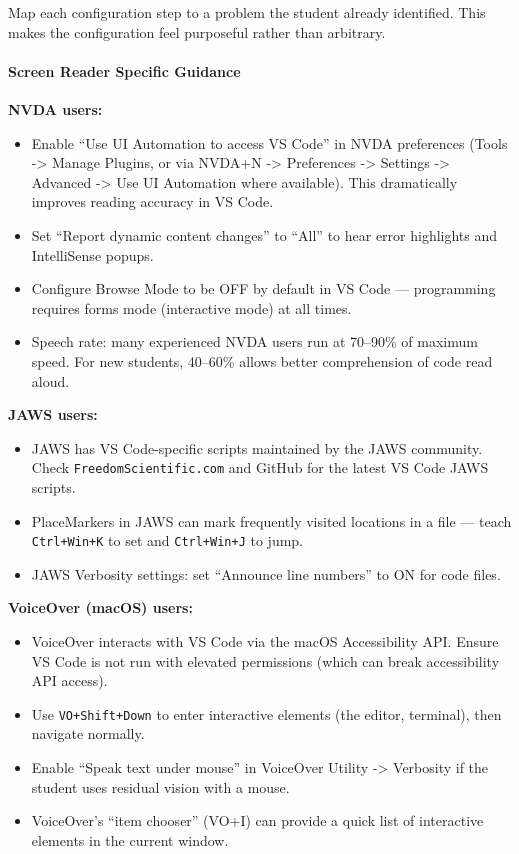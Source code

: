 \documentclass[
  justified,
  openright,
]{tufte-book}
\let\paragraph\paragraph
\let\paragraph\paragraph
\providecommand{\tightlist}{%
  \setlength{\itemsep}{0pt}\setlength{\parskip}{0pt}}
\begin{document}
Map each configuration step to a problem the student already identified.
This makes the configuration feel purposeful rather than arbitrary.

\paragraph{Screen Reader Specific
Guidance}\label{screen-reader-specific-guidance}

\textbf{NVDA users:}

\begin{itemize}
\tightlist
\item
  Enable ``Use UI Automation to access VS Code'' in NVDA preferences
  (Tools -\textgreater{} Manage Plugins, or via NVDA+N -\textgreater{}
  Preferences -\textgreater{} Settings -\textgreater{} Advanced
  -\textgreater{} Use UI Automation where available). This dramatically
  improves reading accuracy in VS Code.
\item
  Set ``Report dynamic content changes'' to ``All'' to hear error
  highlights and IntelliSense popups.
\item
  Configure Browse Mode to be OFF by default in VS Code --- programming
  requires forms mode (interactive mode) at all times.
\item
  Speech rate: many experienced NVDA users run at 70--90\% of maximum
  speed. For new students, 40--60\% allows better comprehension of code
  read aloud.
\end{itemize}

\textbf{JAWS users:}

\begin{itemize}
\tightlist
\item
  JAWS has VS Code-specific scripts maintained by the JAWS community.
  Check \texttt{FreedomScientific.com} and GitHub for the latest VS Code
  JAWS scripts.
\item
  PlaceMarkers in JAWS can mark frequently visited locations in a file
  --- teach \texttt{Ctrl+Win+K} to set and \texttt{Ctrl+Win+J} to jump.
\item
  JAWS Verbosity settings: set ``Announce line numbers'' to ON for code
  files.
\end{itemize}

\textbf{VoiceOver (macOS) users:}

\begin{itemize}
\tightlist
\item
  VoiceOver interacts with VS Code via the macOS Accessibility API.
  Ensure VS Code is not run with elevated permissions (which can break
  accessibility API access).
\item
  Use \texttt{VO+Shift+Down} to enter interactive elements (the editor,
  terminal), then navigate normally.
\item
  Enable ``Speak text under mouse'' in VoiceOver Utility -\textgreater{}
  Verbosity if the student uses residual vision with a mouse.
\item
  VoiceOver's ``item chooser'' (VO+I) can provide a quick list of
  interactive elements in the current window.
\end{itemize}
\end{document}
